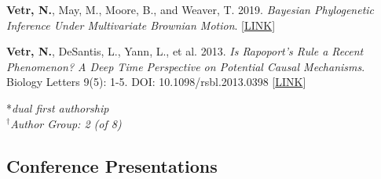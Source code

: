 \documentclass[12pt]{article}
\begin{document}
\begin{enumerate}[label={[\arabic*]}]
\item \textbf{Vetr, N.}, May, M., Moore, B., and Weaver, T. 2019.  \emph{Bayesian Phylogenetic Inference Under Multivariate Brownian Motion}. [\href{https://github.com/NikVetr/papers/blob/main/sysbio-manuscript\%20/mvBM_manuscript_sysbio.pdf}{LINK}]

\item \textbf{Vetr, N.}, DeSantis, L., Yann, L., et al. 2013.  \emph{Is Rapoport’s Rule a Recent Phenomenon? A Deep Time Perspective on Potential Causal Mechanisms}. Biology Letters 9(5): 1-5. DOI: 10.1098/rsbl.2013.0398 [\href{https://royalsocietypublishing.org/doi/10.1098/rsbl.2013.0398}{LINK}]

*\textit{dual first authorship}\\
$^{\dag}$\textit{Author Group: 2 (of 8)}

\end{enumerate}



\subsection{Conference Presentations}
\end{document}

